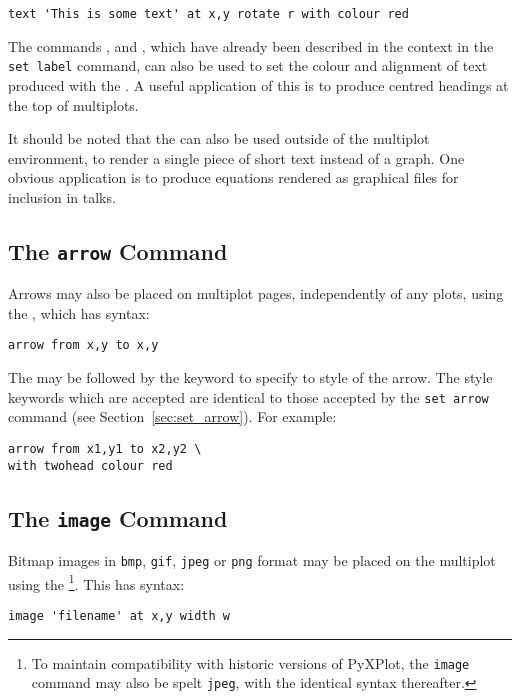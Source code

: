 \begin{verbatim} 
text 'This is some text' at x,y rotate r with colour red
\end{verbatim}

The commands ,  and
, which have already been described in the context in
the {\tt set label} command, can also be used to set the colour and alignment
of text produced with the .  A useful application of this is to
produce centred headings at the top of multiplots.

It should be noted that the  can also be used outside of the
multiplot environment, to render a single piece of short text instead of a
graph. One obvious application is to produce equations rendered as graphical
files for inclusion in talks.

\subsection{The {\tt arrow} Command}

Arrows may also be placed on multiplot pages, independently of any plots, using
the , which has syntax:

\begin{verbatim} 
arrow from x,y to x,y
\end{verbatim}

The  may be followed by the  keyword to specify to
style of the arrow. The style keywords which are accepted are identical to
those accepted by the {\tt set arrow} command (see
Section~\ref{sec:set_arrow}).  For example:

\begin{verbatim} 
arrow from x1,y1 to x2,y2 \
with twohead colour red
\end{verbatim}

\subsection{The {\tt image} Command}

Bitmap images in {\tt bmp}, {\tt gif}, {\tt jpeg} or {\tt png} format may be
placed on the multiplot using the \indcmdt{image}\footnote{To maintain
compatibility with historic versions of PyXPlot, the {\tt image} command may
also be spelt {\tt jpeg}, with the identical syntax thereafter.}. This has
syntax:
\begin{verbatim}
image 'filename' at x,y width w
\end{verbatim}


